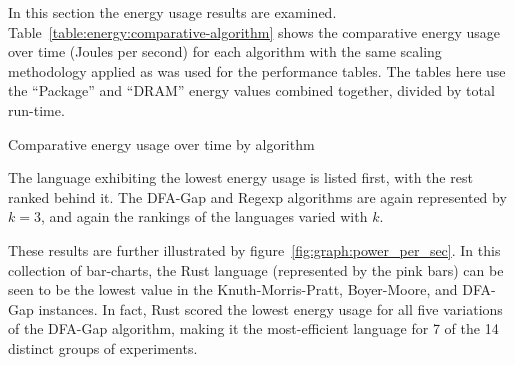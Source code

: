 In this section the energy usage results are examined. Table~\ref{table:energy:comparative-algorithm} shows the comparative energy usage over time (Joules per second) for each algorithm with the same scaling methodology applied as was used for the performance tables. The tables here use the ``Package'' and ``DRAM'' energy values combined together, divided by total run-time.

\begin{table}[!htb]

\caption{Comparative energy usage over time by algorithm}
\label{table:energy:comparative-algorithm}
\end{table}

The language exhibiting the lowest energy usage is listed first, with the rest ranked behind it. The DFA-Gap and Regexp algorithms are again represented by $k=3$, and again the rankings of the languages varied with $k$.

These results are further illustrated by figure~\ref{fig:graph:power_per_sec}. In this collection of bar-charts, the Rust language (represented by the pink bars) can be seen to be the lowest value in the Knuth-Morris-Pratt, Boyer-Moore, and DFA-Gap instances. In fact, Rust scored the lowest energy usage for all five variations of the DFA-Gap algorithm, making it the most-efficient language for 7 of the 14 distinct groups of experiments.

